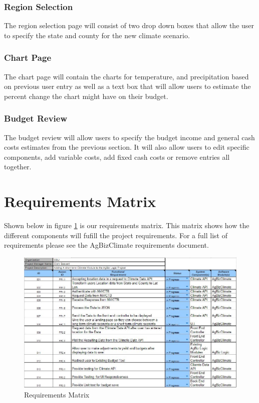 \documentclass[onecolumn, draftclsnofoot,10pt, compsoc]{article}
\begin{document}
		\subsubsection{Region Selection}
		The region selection page will consist of two drop down boxes that allow the user to specify the state and county for the new climate scenario.
		\subsubsection{Chart Page}
		The chart page will contain the charts for temperature, and precipitation based on previous user entry as well as a text box that will allow users to estimate the percent change the chart might have on their budget.
		\subsubsection{Budget Review}
		The budget review will allow users to specify the budget income and general cash costs estimates from the previous section. It will also allow users to edit specific components, add variable costs, add fixed cash costs or remove entries all together.



\clearpage
\section{Requirements Matrix}
	Shown below in figure \ref{fig:ReqMat} is our requirements matrix. This matrix shows how the different components will fufill the project requirements. For a full list of requirements please see the AgBizClimate requirements document.\\


		\begin{figure}[htb]
			\begin{center}
				\includegraphics[width=500pt]{Figures/RequirementsMatrix.jpg}
			\end{center}
			\caption{Requirements Matrix}
			\label{fig:ReqMat}
		\end{figure}
\end{document}
